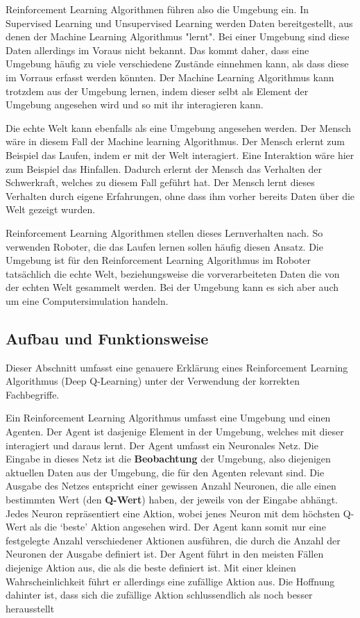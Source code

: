 Reinforcement Learning Algorithmen führen also die Umgebung ein. In Supervised
Learning und Unsupervised Learning werden Daten bereitgestellt, aus denen der
Machine Learning Algorithmus "lernt". Bei einer Umgebung sind diese Daten
allerdings im Voraus nicht bekannt. Das kommt daher, dass eine Umgebung häufig
zu viele verschiedene Zustände einnehmen kann, als dass diese im Vorraus erfasst
werden könnten. Der Machine Learning Algorithmus kann trotzdem aus der Umgebung
lernen, indem dieser selbt als Element der Umgebung angesehen wird und so mit
ihr interagieren kann.

Die echte Welt kann ebenfalls als eine Umgebung angesehen werden. Der Mensch
wäre in diesem Fall der Machine learning Algorithmus. Der Mensch erlernt zum
Beispiel das Laufen, indem er mit der Welt interagiert. Eine Interaktion wäre
hier zum Beispiel das Hinfallen. Dadurch erlernt der Mensch das Verhalten der
Schwerkraft, welches zu diesem Fall geführt hat. Der Mensch lernt dieses
Verhalten durch eigene Erfahrungen, ohne dass ihm vorher bereits Daten über die
Welt gezeigt wurden. 

Reinforcement Learning Algorithmen stellen dieses Lernverhalten nach. So
verwenden Roboter, die das Laufen lernen sollen häufig diesen Ansatz. Die
Umgebung ist für den Reinforcement Learning Algorithmus im Roboter tatsächlich
die echte Welt, beziehungsweise die vorverarbeiteten Daten die von der echten
Welt gesammelt werden. Bei der Umgebung kann es sich aber auch um eine
Computersimulation handeln.

\subsection*{Aufbau und Funktionsweise}
Dieser Abschnitt umfasst eine genauere Erklärung eines Reinforcement Learning
Algorithmus (Deep Q-Learning) unter der Verwendung der korrekten Fachbegriffe.

Ein Reinforcement Learning Algorithmus umfasst eine Umgebung und einen Agenten.
Der Agent ist dasjenige Element in der Umgebung, welches mit dieser interagiert
und daraus lernt. Der Agent umfasst ein Neuronales Netz. Die Eingabe in dieses
Netz ist die \textbf{Beobachtung} der Umgebung, also diejenigen aktuellen Daten
aus der Umgebung, die für den Agenten relevant sind. Die Ausgabe des Netzes
entspricht einer gewissen Anzahl Neuronen, die alle einen bestimmten Wert (den
\textbf{Q-Wert}) haben, der jeweils von der Eingabe abhängt. Jedes Neuron
repräsentiert eine Aktion, wobei jenes Neuron mit dem höchsten Q-Wert als die
`beste' Aktion angesehen wird. Der Agent kann somit nur eine festgelegte Anzahl
verschiedener Aktionen ausführen, die durch die Anzahl der Neuronen der Ausgabe
definiert ist. Der Agent führt in den meisten Fällen diejenige Aktion aus, die
als die beste definiert ist. Mit einer kleinen Wahrscheinlichkeit führt er
allerdings eine zufällige Aktion aus. Die Hoffnung dahinter ist, dass sich die
zufällige Aktion schlussendlich als noch besser herausstellt 

